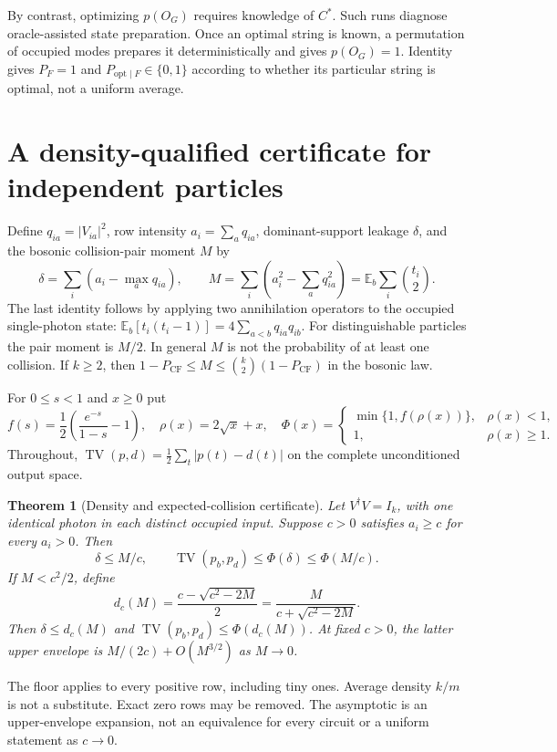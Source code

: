 \documentclass[11pt,a4paper]{article}
\newtheorem{theorem}{Theorem}
\theoremstyle{remark}\newtheorem{remark}[theorem]{Remark}
\DeclareMathOperator{\TV}{TV}
\newcommand{\E}{\mathbb E}
\newcommand{\CF}{\mathrm{CF}}
\newcommand{\opt}{\mathrm{opt}}
\begin{document}
By contrast, optimizing $p(O_G)$ requires knowledge of $C^*$. Such runs diagnose oracle-assisted state preparation. Once an optimal string is known, a permutation of occupied modes prepares it deterministically and gives $p(O_G)=1$. Identity gives $P_F=1$ and $P_{\opt\mid F}\in\{0,1\}$ according to whether its particular string is optimal, not a uniform average.

\section{A density-qualified certificate for independent particles}\label{sec:certificate}
Define $q_{ia}=|V_{ia}|^2$, row intensity $a_i=\sum_aq_{ia}$, dominant-support leakage $\delta$, and the bosonic collision-pair moment $M$ by
\begin{equation}
 \delta=\sum_i(a_i-\max_aq_{ia}),\qquad
 M=\sum_i\left(a_i^2-\sum_aq_{ia}^2\right)
   =\E_b\sum_i\binom{t_i}{2}.\label{eq:moment}
\end{equation}
The last identity follows by applying two annihilation operators to the occupied single-photon state: $\E_b[t_i(t_i-1)]=4\sum_{a<b}q_{ia}q_{ib}$. For distinguishable particles the pair moment is $M/2$. In general $M$ is not the probability of at least one collision. If $k\ge2$, then $1-P_{\CF}\le M\le\binom{k}{2}(1-P_{\CF})$ in the bosonic law.

For $0\le s<1$ and $x\ge0$ put
\begin{equation}
 f(s)=\frac12\left(\frac{e^{-s}}{1-s}-1\right),\quad
 \rho(x)=2\sqrt{x}+x,\quad
 \Phi(x)=\begin{cases}\min\{1,f(\rho(x))\},&\rho(x)<1,\\1,&\rho(x)\ge1.\end{cases}\label{eq:envelope}
\end{equation}
Throughout, $\TV(p,d)=\tfrac12\sum_t|p(t)-d(t)|$ on the complete unconditioned output space.

\begin{theorem}[Density and expected-collision certificate]\label{thm:density}
Let $V^\dagger V=I_k$, with one identical photon in each distinct occupied input. Suppose $c>0$ satisfies $a_i\ge c$ for every $a_i>0$. Then
\begin{equation}
 \delta\le M/c,\qquad \TV(p_b,p_d)\le\Phi(\delta)\le\Phi(M/c).\label{eq:coarse}
\end{equation}
If $M<c^2/2$, define
\begin{equation}
 d_c(M)=\frac{c-\sqrt{c^2-2M}}2
       =\frac{M}{c+\sqrt{c^2-2M}}.
\end{equation}
Then $\delta\le d_c(M)$ and $\TV(p_b,p_d)\le\Phi(d_c(M))$. At fixed $c>0$, the latter upper envelope is $M/(2c)+O(M^{3/2})$ as $M\to0$.
\end{theorem}
The floor applies to every positive row, including tiny ones. Average density $k/m$ is not a substitute. Exact zero rows may be removed. The asymptotic is an upper-envelope expansion, not an equivalence for every circuit or a uniform statement as $c\to0$.
\end{document}
